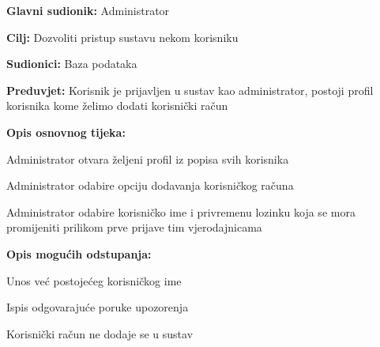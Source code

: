 			\noindent {}
			\begin{packed_item}
				
				\item \textbf{Glavni sudionik: }Administrator
				\item  \textbf{Cilj:} Dozvoliti pristup sustavu nekom korisniku
				\item  \textbf{Sudionici:} Baza podataka
				\item  \textbf{Preduvjet:} Korisnik je prijavljen u sustav kao administrator, postoji profil korisnika kome želimo dodati korisnički račun
				\item  \textbf{Opis osnovnog tijeka:}
				
				\item[] \begin{packed_enum}
					
					\item Administrator otvara željeni profil iz popisa svih korisnika
					\item Administrator odabire opciju dodavanja korisničkog računa
					\item Administrator odabire korisničko ime i privremenu lozinku koja se mora promijeniti prilikom prve prijave tim vjerodajnicama
					
					
				\end{packed_enum}
			
				\item  \textbf{Opis mogućih odstupanja:}
				
				\item[] \begin{packed_item}
					
					\item[3.1] Unos već postojećeg korisničkog ime
					\item[] \begin{packed_enum}
						
						\item Ispis odgovarajuće poruke upozorenja
						\item Korisnički račun ne dodaje se u sustav
						
					\end{packed_enum}
					
				\end{packed_item}
				
			\end{packed_item}
		
